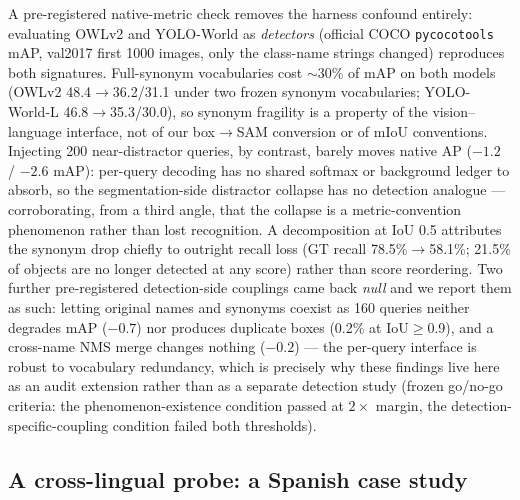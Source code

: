 \documentclass[11pt]{article}
\newcommand{\miou}{mIoU}
\begin{document}
A pre-registered native-metric check removes the harness confound entirely:
evaluating OWLv2 and YOLO-World as \emph{detectors} (official COCO
\texttt{pycocotools} mAP, val2017 first 1000 images, only the class-name
strings changed) reproduces both signatures. Full-synonym vocabularies cost
$\sim$30\% of mAP on both models (OWLv2 48.4$\to$36.2/31.1 under two frozen
synonym vocabularies; YOLO-World-L 46.8$\to$35.3/30.0), so synonym
fragility is a property of the vision--language interface, not of our
box$\to$SAM conversion or of \miou{} conventions. Injecting 200
near-distractor queries, by contrast, barely moves native AP ($-1.2$ /
$-2.6$ mAP): per-query decoding has no shared softmax or background ledger
to absorb, so the segmentation-side distractor collapse has no detection
analogue --- corroborating, from a third angle, that the collapse is a
metric-convention phenomenon rather than lost recognition. A decomposition
at IoU 0.5 attributes the synonym drop chiefly to outright recall loss
(GT recall 78.5\%$\to$58.1\%; 21.5\% of objects are no longer detected at
any score) rather than score reordering. Two further pre-registered
detection-side couplings came back \emph{null} and we report them as such:
letting original names and synonyms coexist as 160 queries neither degrades
mAP ($-0.7$) nor produces duplicate boxes (0.2\% at IoU$\ge$0.9), and a
cross-name NMS merge changes nothing ($-0.2$) --- the per-query interface
is robust to vocabulary redundancy, which is precisely why these findings
live here as an audit extension rather than as a separate detection study
(frozen go/no-go criteria: the phenomenon-existence condition passed at
$2\times$ margin, the detection-specific-coupling condition failed both
thresholds).

\subsection{A cross-lingual probe: a Spanish case study}
\label{sec:xlang}
\end{document}
